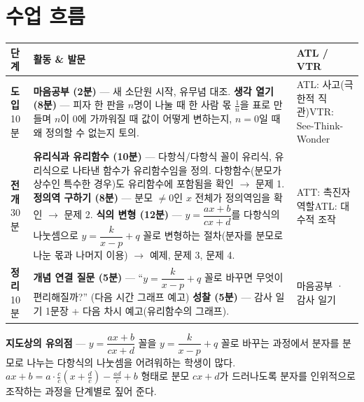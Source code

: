 \documentclass[11pt,a4paper]{article}
\begin{document}
\section{수업 흐름}
\begin{tabularx}{\linewidth}{@{}>{\centering\arraybackslash}p{1.6cm}X>{\raggedright\arraybackslash\small}p{3.1cm}@{}}
\toprule
\textbf{단계} & \textbf{활동 \& 발문} & \textbf{ATL / VTR} \\
\midrule
\textcolor{goldstrong}{\textbf{도입}}\newline\footnotesize 10분 &
\textbf{마음공부 (2분)} --- 새 소단원 시작, 유무념 대조.\newline
\textbf{생각 열기 (8분)} --- 피자 한 판을 $n$명이 나눌 때 한 사람 몫 $\frac{1}{n}$을 표로 만들며 $n$이 $0$에 가까워질 때 값이 어떻게 변하는지, $n=0$일 때 왜 정의할 수 없는지 토의. &
ATL: 사고(극한적 직관)\newline VTR: See-Think-Wonder \\
\addlinespace
\textcolor{goldstrong}{\textbf{전개}}\newline\footnotesize 30분 &
\textbf{유리식과 유리함수 (10분)} --- 다항식/다항식 꼴이 유리식, 유리식으로 나타낸 함수가 유리함수임을 정의. 다항함수(분모가 상수인 특수한 경우)도 유리함수에 포함됨을 확인 $\to$ 문제 1.\newline
\textbf{정의역 구하기 (8분)} --- 분모 $\neq 0$인 $x$ 전체가 정의역임을 확인 $\to$ 문제 2.\newline
\textbf{식의 변형 (12분)} --- $y=\dfrac{ax+b}{cx+d}$를 다항식의 나눗셈으로 $y=\dfrac{k}{x-p}+q$ 꼴로 변형하는 절차(분자를 분모로 나눈 몫과 나머지 이용) $\to$ 예제, 문제 3, 문제 4. &
ATT: 촉진자 역할\newline ATL: 대수적 조작 \\
\addlinespace
\textcolor{goldstrong}{\textbf{정리}}\newline\footnotesize 10분 &
\textbf{개념 연결 질문 (5분)} --- ``$y=\dfrac{k}{x-p}+q$ 꼴로 바꾸면 무엇이 편리해질까?'' (다음 시간 그래프 예고)\newline
\textbf{성찰 (5분)} --- 감사 일기 1문장 + 다음 차시 예고(유리함수의 그래프). &
마음공부 · 감사 일기 \\
\bottomrule
\end{tabularx}

\begin{calloutbox}
\textbf{지도상의 유의점} --- $y=\dfrac{ax+b}{cx+d}$ 꼴을 $y=\dfrac{k}{x-p}+q$ 꼴로 바꾸는 과정에서 분자를 분모로 나누는 다항식의 나눗셈을 어려워하는 학생이 많다. $ax+b = a\cdot\frac{c}{c}\left(x+\frac{d}{c}\right) - \frac{ad}{c}+b$ 형태로 분모 $cx+d$가 드러나도록 분자를 인위적으로 조작하는 과정을 단계별로 짚어 준다.
\end{calloutbox}
\end{document}
